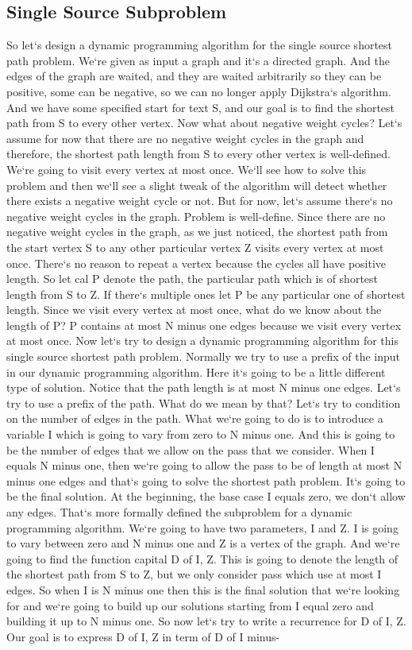 \subsection{Single Source  Subproblem}
So let`s design a dynamic programming algorithm for the single source shortest path problem.
We`re given as input a graph and it`s a directed graph.
And the edges of the graph are waited, and they are waited arbitrarily so they can be positive, some can be negative, so we can no longer apply Dijkstra`s algorithm.
And we have some specified start for text S, and our goal is to find the shortest path from S to every other vertex.
Now what about negative weight cycles? Let`s assume for now that there are no negative weight cycles in the graph and therefore, the shortest path length from S to every other vertex is well-defined.
We`re going to visit every vertex at most once.
We`ll see how to solve this problem and then we`ll see a slight tweak of the algorithm will detect whether there exists a negative weight cycle or not.
But for now, let`s assume there`s no negative weight cycles in the graph.
Problem is well-define.
Since there are no negative weight cycles in the graph, as we just noticed, the shortest path from the start vertex S to any other particular vertex Z visits every vertex at most once.
There`s no reason to repeat a vertex because the cycles all have positive length.
So let cal P denote the path, the particular path which is of shortest length from S to Z\@.
If there`s multiple ones let P be any particular one of shortest length.
Since we visit every vertex at most once, what do we know about the length of P? P contains at most N minus one edges because we visit every vertex at most once.
Now let`s try to design a dynamic programming algorithm for this single source shortest path problem.
Normally we try to use a prefix of the input in our dynamic programming algorithm.
Here it`s going to be a little different type of solution.
Notice that the path length is at most N minus one edges.
Let`s try to use a prefix of the path.
What do we mean by that? Let`s try to condition on the number of edges in the path.
What we`re going to do is to introduce a variable I which is going to vary from zero to N minus one.
And this is going to be the number of edges that we allow on the pass that we consider.
When I equals N minus one, then we`re going to allow the pass to be of length at most N minus one edges and that`s going to solve the shortest path problem.
It`s going to be the final solution.
At the beginning, the base case I equals zero, we don`t allow any edges.
That`s more formally defined the subproblem for a dynamic programming algorithm.
We`re going to have two parameters, I and Z\@.
I is going to vary between zero and N minus one and Z is a vertex of the graph.
And we`re going to find the function capital D of I, Z\@.
This is going to denote the length of the shortest path from S to Z, but we only consider pass which use at most I edges.
So when I is N minus one then this is the final solution that we`re looking for and we`re going to build up our solutions starting from I equal zero and building it up to N minus one.
So now let`s try to write a recurrence for D of I, Z\@.
Our goal is to express D of I, Z in term of D of I minus-

